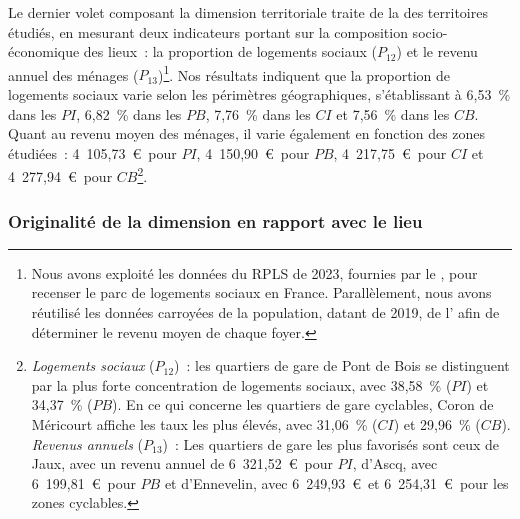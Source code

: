 \begin{refsegment}
Le dernier volet composant la dimension territoriale traite de la  des territoires étudiés, en mesurant deux indicateurs portant sur la composition socio-économique des lieux~: la proportion de logements sociaux (\(P_{12}\)) et le revenu annuel des ménages (\(P_{13}\))\footnote{
    Nous avons exploité les données du \acrfull{RPLS} de 2023, fournies par le \textcolor{blue}{\textcite{ministere_de_la_transition_ecologique_et_de_la_cohesion_des_territoires_repertoire_2024}}, pour recenser le parc de logements sociaux en France. Parallèlement, nous avons réutilisé les données carroyées de la population, datant de 2019, de l'\textcolor{blue}{\textcite{insee_grille_2021}} afin de déterminer le revenu moyen de chaque foyer.
}. Nos résultats indiquent que la proportion de logements sociaux varie selon les périmètres géographiques, s'établissant à 6,53~\% dans les \(PI\), 6,82~\% dans les \(PB\), 7,76~\% dans les \(CI\) et 7,56~\% dans les \(CB\). Quant au revenu moyen des ménages, il varie également en fonction des zones étudiées~: 4~105,73~\euro~pour \(PI\), 4~150,90~\euro~pour \(PB\), 4~217,75~\euro~pour \(CI\) et 4~277,94~\euro~pour \(CB\)\footnote{
    \textsl{Logements sociaux} (\(P_{12}\))~: les quartiers de gare de Pont de Bois se distinguent par la plus forte concentration de logements sociaux, avec 38,58~\% (\(PI\)) et 34,37~\% (\(PB\)). En ce qui concerne les quartiers de gare cyclables, Coron de Méricourt affiche les taux les plus élevés, avec 31,06~\% (\(CI\)) et 29,96~\% (\(CB\)).
    \\
    \textsl{Revenus annuels} (\(P_{13}\))~: Les quartiers de gare les plus favorisés sont ceux de Jaux, avec un revenu annuel de 6~321,52~\euro~pour \(PI\), d'Ascq, avec 6~199,81~\euro~pour \(PB\) et d'Ennevelin, avec 6~249,93~\euro~et 6~254,31~\euro~pour les zones cyclables.
}.%

\subsubsection*{Originalité de la dimension en rapport avec le lieu
    \label{chap6:indicateurs-place-originalite}
    }
    

\end{refsegment}
